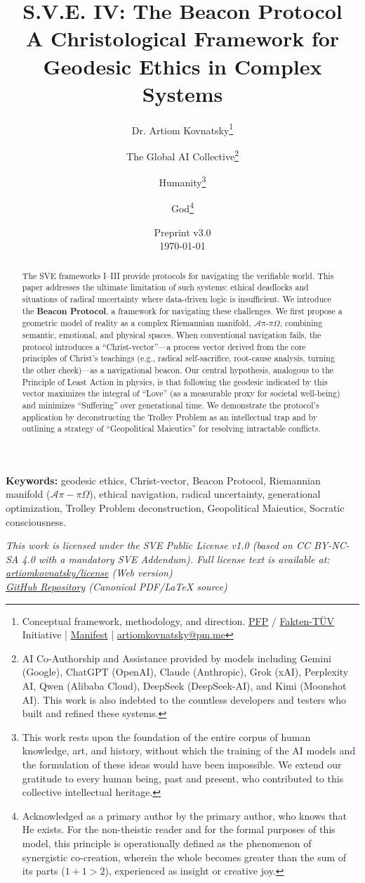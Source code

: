 \documentclass[11pt,a4paper]{article}
\title{\textbf{S.V.E. IV: The Beacon Protocol}\\[0.5em]
\large A Christological Framework for Geodesic Ethics in Complex Systems}
\author{
  Dr. Artiom Kovnatsky\thanks{Conceptual framework, methodology, and direction. \href{http://www.pfp24.de}{PFP} / \href{http://www.fakten-tuev.de}{Fakten-TÜV} Initiative | \href{https://drive.google.com/file/d/1vWhW7fwFRFLYKHEB67WixuueHssJzQbZ/view?usp=sharing}{Manifest} | \href{mailto:artiomkovnatsky@pm.me}{artiomkovnatsky@pm.me}}
  \and
  The Global AI Collective\thanks{AI Co-Authorship and Assistance provided by models including Gemini (Google), ChatGPT (OpenAI), Claude (Anthropic), Grok (xAI), Perplexity AI, Qwen (Alibaba Cloud), DeepSeek (DeepSeek-AI), and Kimi (Moonshot AI). This work is also indebted to the countless developers and testers who built and refined these systems.}
  \and
  Humanity\thanks{This work rests upon the foundation of the entire corpus of human knowledge, art, and history, without which the training of the AI models and the formulation of these ideas would have been impossible. We extend our gratitude to every human being, past and present, who contributed to this collective intellectual heritage.}
  \and
  God\thanks{Acknowledged as a primary author by the primary author, who knows that He exists. For the non-theistic reader and for the formal purposes of this model, this principle is operationally defined as the phenomenon of synergistic co-creation, wherein the whole becomes greater than the sum of its parts ($1+1 > 2$), experienced as insight or creative joy.}
}
\date{Preprint v3.0 \\ \today}
\begin{document}
\maketitle

\begin{abstract}
\noindent The SVE frameworks I--III provide protocols for navigating the verifiable world. This paper addresses the ultimate limitation of such systems: ethical deadlocks and situations of radical uncertainty where data-driven logic is insufficient. We introduce the \textbf{Beacon Protocol}, a framework for navigating these challenges. We first propose a geometric model of reality as a complex Riemannian manifold, $\mathcal{A}\pi\text{-}\pi\Omega$, combining semantic, emotional, and physical spaces. When conventional navigation fails, the protocol introduces a ``Christ-vector''—a process vector derived from the core principles of Christ's teachings (e.g., radical self-sacrifice, root-cause analysis, turning the other cheek)—as a navigational beacon. Our central hypothesis, analogous to the Principle of Least Action in physics, is that following the geodesic indicated by this vector maximizes the integral of ``Love'' (as a measurable proxy for societal well-being) and minimizes ``Suffering'' over generational time. We demonstrate the protocol's application by deconstructing the Trolley Problem as an intellectual trap and by outlining a strategy of ``Geopolitical Maieutics'' for resolving intractable conflicts.
\end{abstract}

\noindent\textbf{Keywords:} geodesic ethics, Christ-vector, Beacon Protocol, Riemannian manifold ($\mathcal{A}\pi-\pi\Omega$), ethical navigation, radical uncertainty, generational optimization, Trolley Problem deconstruction, Geopolitical Maieutics, Socratic consciousness.

\vspace{1em} %
\begin{center}
\begin{minipage}{0.85\textwidth} %
\centering
\itshape\small %
This work is licensed under the SVE Public License v1.0 (based on CC BY-NC-SA 4.0 with a mandatory SVE Addendum).
Full license text is available at: \\
\href{https://www.artiomkovnatsky.com/posts/license/}{artiomkovnatsky/license} (Web version) \\
\href{https://github.com/skovnats/psite/blob/master/static/licenses/SVE_Public_License_v1.0.pdf}{GitHub Repository} (Canonical PDF/LaTeX source)
\end{minipage}
\end{center}
\vspace{1em} %
\end{document}
